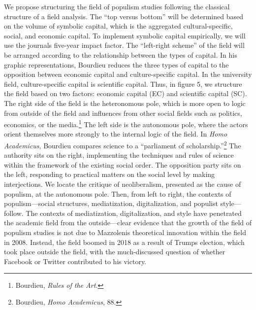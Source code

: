 \documentclass{tufte-handout}
\begin{document}
We propose structuring the field of populism studies following the
classical structure of a field analysis. The ``top versus bottom'' will
be determined based on the volume of symbolic capital, which is the
aggregated cultural-specific, social, and economic capital. To implement
symbolic capital empirically, we will use the journal\textquotesingle s
five-year impact factor. The ``left-right scheme'' of the field will be
arranged according to the relationship between the types of capital. In
his graphic representations, Bourdieu reduces the three types of capital
to the opposition between economic capital and culture-specific capital.
In the university field, culture-specific capital is scientific capital.
Thus, in figure 5, we structure the field based on two factors: economic
capital (EC) and scientific capital (SC). The right side of the field is
the heteronomous pole, which is more open to logic from outside of the
field and influences from other social fields such as politics,
economics, or the media.\footnote{Bourdieu, \emph{Rules of the Art.}}
The left side is the autonomous pole, where the actors orient themselves
more strongly to the internal logic of the field. In \emph{Homo
Academicus}, Bourdieu compares science to a ``parliament of
scholarship.''\footnote{Bourdieu, \emph{Homo Academicus}, 88.} The
authority sits on the right, implementing the techniques and rules of
science within the framework of the existing social order. The
opposition party sits on the left, responding to practical matters on
the social level by making interjections. We locate the critique of
neoliberalism, presented as the cause of populism, at the autonomous
pole. Then, from left to right, the contexts of populism---social
structures, mediatization, digitalization, and populist style---follow.
The contexts of mediatization, digitalization, and style have penetrated
the academic field from the outside---clear evidence that the growth of
the field of populism studies is not due to Mazzoleni\textquotesingle s
theoretical innovation within the field in 2008. Instead, the field
boomed in 2018 as a result of Trump\textquotesingle s election, which
took place outside the field, with the much-discussed question of
whether Facebook or Twitter contributed to his victory.
\end{document}
